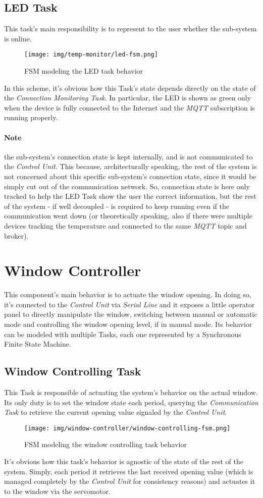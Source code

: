 \documentclass[a4paper,12pt]{report}
\begin{document}
		\subsection{LED Task}
		This task's main responsibility is to represent to the user whether the sub-system is online.
		\begin{figure}[H]
			\centering{}
			\texttt{[image: img/temp-monitor/led-fsm.png]}
			\caption{FSM modeling the LED task behavior}
			\label{img:temp-monitor/led-fsm}
		\end{figure}
		In this scheme, it's obvious how this Task's state depends directly on the state of the \textit{Connection Monitoring Task}. In particular, the LED is shown as green only when the device is fully connected to the Internet and the \textit{MQTT} subscription is running properly.
		\paragraph{Note} the sub-system's connection state is kept internally, and is not communicated to the \textit{Control Unit}. This because, architecturally speaking, the rest of the system is not concerned about this specific sub-system's connection state, since it would be simply cut out of the communication network. So, connection state is here only tracked to help the LED Task show the user the correct information, but the rest of the system - if well decoupled - is required to keep running even if the communication went down (or theoretically speaking, also if there were multiple devices tracking the temperature and connected to the same \textit{MQTT} topic and broker).
	\section{Window Controller}
	This component's main behavior is to actuate the window opening. In doing so, it's connected to the \textit{Control Unit} via \textit{Serial Line} and it exposes a little operator panel to directly manipulate the window, switching between manual or automatic mode and controlling the window opening level, if in manual mode. Its behavior can be modeled with multiple Tasks, each one represented by a Synchronous Finite State Machine.
		\subsection{Window Controlling Task}
		This Task is responsible of actuating the system's behavior on the actual window. Its only duty is to set the window state each period, querying the \textit{Communication Task} to retrieve the current opening value signaled by the \textit{Control Unit}.
		\begin{figure}[H]
			\centering{}
			\texttt{[image: img/window-controller/window-controlling-fsm.png]}
			\caption{FSM modeling the window controlling task behavior}
			\label{img:window-controller/window-controlling-fsm}
		\end{figure}
		It's obvious how this task's behavior is agnostic of the state of the rest of the system. Simply, each period it retrieves the last received opening value (which is managed completely by the \textit{Control Unit} for consistency reasons) and actuates it to the window via the servomotor.
\end{document}
